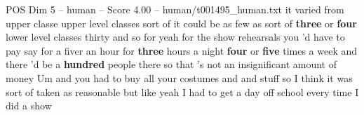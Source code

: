 \begin{textsample}{POS Dim 5 – human – Score 4.00 – human/t001495\_human.txt}  \label{ex:f5_pos_020}
it varied from upper classe upper level classes sort of it could be as few as sort of \textbf{three} or \textbf{four} lower level classes thirty and so for yeah for the show rehearsals you 'd have to pay say for a fiver an hour for \textbf{three} hours a night \textbf{four} or \textbf{five} times a week and there 'd be a \textbf{hundred} people there so that 's not an insignificant amount of money Um and you had to buy all your costumes and and stuff so I think it was sort of taken as reasonable but like yeah I had to get a day off school every time I did a show

\end{textsample}
